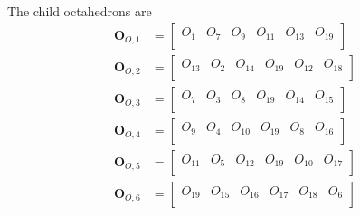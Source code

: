 \documentclass{mitschrift}
\begin{document}
The child octahedrons are \begin{align}
    \mathbf{O}_{O,1} &= \begin{bmatrix}
        O_1 & O_7 & O_{9} & O_{11} & O_{13} & O_{19} \\
    \end{bmatrix} \\
    \mathbf{O}_{O,2} &= \begin{bmatrix}
        O_{13} & O_{2} & O_{14} & O_{19}& O_{12} & O_{18} \\
    \end{bmatrix} \\
    \mathbf{O}_{O,3} &= \begin{bmatrix}
        O_{7} & O_{3} & O_{8} & O_{19}& O_{14} & O_{15} \\
    \end{bmatrix} \\
    \mathbf{O}_{O,4} &= \begin{bmatrix}
        O_9 & O_{4} & O_{10} & O_{19}& O_{8} & O_{16} \\
    \end{bmatrix} \\
    \mathbf{O}_{O,5} &= \begin{bmatrix}
        O_{11} & O_{5} & O_{12} & O_{19}& O_{10} & O_{17} \\
    \end{bmatrix} \\
    \mathbf{O}_{O,6} &= \begin{bmatrix}
        O_{19} & O_{15} & O_{16} & O_{17}& O_{18} & O_{6} \\
    \end{bmatrix}
\end{align}
\end{document}
